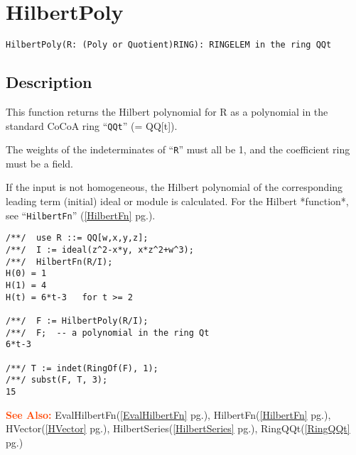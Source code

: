\documentclass[a4paper]{mybook}
\newenvironment{command}{}{} %
\newcommand\SeeAlso{\par\textcolor{OrangeRed}{\textbf{\large See Also: }}}
\begin{document}
\section{HilbertPoly}
\label{HilbertPoly}
\begin{command} %


\begin{Verbatim}[label=syntax, rulecolor=\color{MidnightBlue},
frame=single]
HilbertPoly(R: (Poly or Quotient)RING): RINGELEM in the ring QQt
\end{Verbatim}


\subsection*{Description}

This function returns the Hilbert polynomial for R as a polynomial in
the standard CoCoA ring ``\verb&QQt&'' (= QQ[t]).
\par 
The weights of the indeterminates of ``\verb&R&'' must all be 1, and the
coefficient ring must be a field.
\par 
If the input is not homogeneous, the Hilbert polynomial of the
corresponding leading term (initial) ideal or module is calculated.
For the Hilbert *function*, see ``\verb&HilbertFn&'' (\ref{HilbertFn} pg.\pageref{HilbertFn}).
\begin{Verbatim}[label=example, rulecolor=\color{PineGreen}, frame=single]
/**/  use R ::= QQ[w,x,y,z];
/**/  I := ideal(z^2-x*y, x*z^2+w^3);
/**/  HilbertFn(R/I);
H(0) = 1
H(1) = 4
H(t) = 6*t-3   for t >= 2

/**/  F := HilbertPoly(R/I);
/**/  F;  -- a polynomial in the ring Qt
6*t-3

/**/ T := indet(RingOf(F), 1);
/**/ subst(F, T, 3);
15
\end{Verbatim}


\SeeAlso %
  EvalHilbertFn(\ref{EvalHilbertFn} pg.\pageref{EvalHilbertFn}), 
    HilbertFn(\ref{HilbertFn} pg.\pageref{HilbertFn}), 
    HVector(\ref{HVector} pg.\pageref{HVector}), 
    HilbertSeries(\ref{HilbertSeries} pg.\pageref{HilbertSeries}), 
    RingQQt(\ref{RingQQt} pg.\pageref{RingQQt})
\end{command} %
\end{document}
